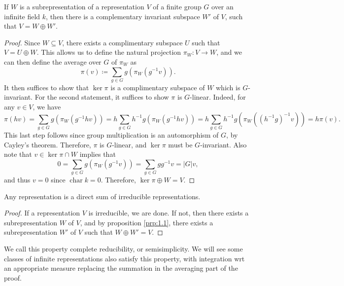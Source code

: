 \begin{proposition}\label{prp:1.1}
	If $W$ is a subrepresentation of a representation $V$ of a finite group $G$ over an infinite field $k$, then there is a complementary invariant subspace $W'$ of $V$, such that $V=W\oplus W'$.
\end{proposition}
\begin{proof}
	Since $W\subseteq V$, there exists a complimentary subspace $U$ such that $V=U\oplus W$. This allows us to define the natural projection $\pi_W : V \to W$, and we can then define the average over $G$ of $\pi _W$ as
	\[
		\pi (v)\coloneqq \sum_{g\in G} g(\pi _W(g^{-1} v))
	.\]
	It then suffices to show that $\ker \pi $ is a complimentary subspace of $W$ which is $G$-invariant. For the second statement, it suffices to show $\pi $ is $G$-linear. Indeed, for any $v\in V$, we have
	\[
		\pi (hv)=\sum_{g\in G} g(\pi _W(g^{-1} hv))=h \sum_{g\in G} h^{-1} g\left( \pi _W\left( g^{-1} hv \right)  \right) =h \sum_{g\in G} h^{-1} g\left( \pi _W\left( \left( h^{-1} g \right) ^{-1} v \right)  \right) =h\pi (v)
	.\]
	This last step follows since group multiplication is an automorphism of $G$, by Cayley's theorem. Therefore, $\pi  $ is $G$-linear, and $\ker \pi  $ must be $G$-invariant. Also note that $v\in \ker \pi \cap W$ implies that
	\[
		0=\sum_{g\in G} g(\pi_W(g^{-1} v))=\sum_{g\in G} gg^{-1} v=|G|v,
	\]
	and thus $v=0$ since $\operatorname{char} k=0$. Therefore, $\ker \pi \oplus W=V$.
\end{proof}
\begin{corollary}\label{cor:1.1}
	Any representation is a direct sum of irreducible representations.
\end{corollary}
\begin{proof}
	If a representation $V$ is irreducible, we are done. If not, then there exists a subrepresentation $W$ of $V$, and by proposition \ref{prp:1.1}, there exists a subrepresentation $W'$ of $V$ such that $W\oplus W'=V$.
\end{proof}

We call this property complete reducibility, or semisimplicity. We will see some classes of infinite representations also satisfy this property, with integration wrt an appropriate measure replacing the summation in the averaging part of the proof.

